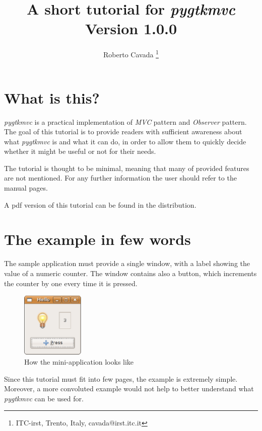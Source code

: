 \documentclass{article}
\newcommand{\kw}[1]{\emph{#1}\xspace}
\newcommand{\mvc}{\kw{MVC} pattern\xspace}
\newcommand{\obs}{\kw{Observer} pattern\xspace}
\newcommand{\pygtkmvc}{\kw{pygtkmvc}}
\begin{document}
\title{A short tutorial for \pygtkmvc\\
Version 1.0.0}

\author{ Roberto Cavada \thanks{ITC-irst, Trento, Italy,
 cavada@irst.itc.it} }

\maketitle


\section{What is this?}
\pygtkmvc is a practical implementation of \mvc and \obs. The goal of
this tutorial is to provide readers with sufficient awareness about
what \pygtkmvc is and what it can do, in order to allow them to
quickly decide whether it might be useful or not for their needs.

The tutorial is thought to be minimal, meaning that many of provided
features are not mentioned. For any further information the user
should refer to the manual pages.

A pdf version of this tutorial can be found in the distribution.


\section{The example in few words}
The sample application must provide a single window, with a label
showing the value of a numeric counter. The window contains also a
button, which increments the counter by one every time it is pressed.

\begin{figure}[htbp]
\begin{center}
\includegraphics[width=3cm]{eps/appl.eps}
\caption{How the mini-application looks like}
\end{center}
\end{figure}


Since this tutorial must fit into few pages, the example is extremely
simple. Moreover, a more convoluted example would not help to better
understand what \pygtkmvc can be used for.
\end{document}
